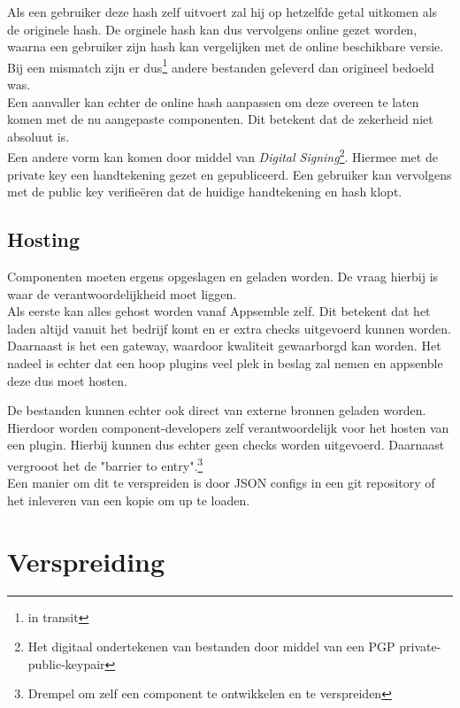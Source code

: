Als een gebruiker deze hash zelf uitvoert zal hij op hetzelfde getal uitkomen als de originele hash. De orginele hash kan dus vervolgens online gezet worden, waarna een gebruiker zijn hash kan vergelijken met de online beschikbare versie. Bij een mismatch zijn er dus\footnote{in transit} andere bestanden geleverd dan origineel bedoeld was. \\

Een aanvaller kan echter de online hash aanpassen om deze overeen te laten komen met de nu aangepaste componenten. Dit betekent dat de zekerheid niet absoluut is. \\

Een andere vorm kan komen door middel van \emph{Digital Signing}\footnote{Het digitaal ondertekenen van bestanden door middel van een PGP private-public-keypair}. Hiermee met de private key een handtekening gezet en gepubliceerd. Een gebruiker kan vervolgens met de public key verifie\"{e}ren dat de huidige handtekening en hash klopt.\cite{crypto1}

\subsection{Hosting}

Componenten moeten ergens opgeslagen en geladen worden. De vraag hierbij is waar de verantwoordelijkheid moet liggen. \\

Als eerste kan alles gehost worden vanaf Appsemble zelf. Dit betekent dat het laden altijd vanuit het bedrijf komt en er extra checks uitgevoerd kunnen worden. Daarnaast is het een gateway, waardoor kwaliteit gewaarborgd kan worden. Het nadeel is echter dat een hoop plugins veel plek in beslag zal nemen en appsenble deze dus moet hosten.

De bestanden kunnen echter ook direct van externe bronnen geladen worden. Hierdoor worden component-developers zelf verantwoordelijk voor het hosten van een plugin. Hierbij kunnen dus echter geen checks worden uitgevoerd. Daarnaast vergrooot het de "barrier to entry".\footnote{Drempel om zelf een component te ontwikkelen en te verspreiden}\\

 Een manier om dit te verspreiden is door JSON configs in een git repository of het inleveren van een kopie om up te loaden.

\section{Verspreiding}
